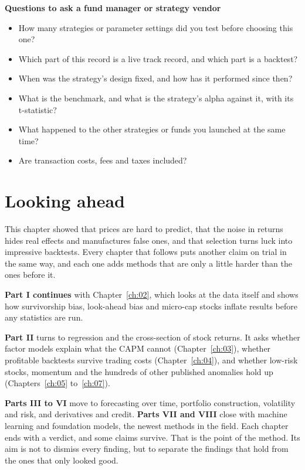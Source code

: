 \textbf{Questions to ask a fund manager or strategy vendor}

\begin{itemize}
  \item How many strategies or parameter settings did you test before choosing this one?
  \item Which part of this record is a live track record, and which part is a backtest?
  \item When was the strategy's design fixed, and how has it performed since then?
  \item What is the benchmark, and what is the strategy's alpha against it, with its t-statistic?
  \item What happened to the other strategies or funds you launched at the same time?
  \item Are transaction costs, fees and taxes included?
\end{itemize}

\section{Looking ahead}
\label{sec:01-ahead}

This chapter showed that prices are hard to predict, that the noise in returns hides real effects and manufactures false ones, and that selection turns luck into impressive backtests. Every chapter that follows puts another claim on trial in the same way, and each one adds methods that are only a little harder than the ones before it.

\textbf{Part I continues} with Chapter~\ref{ch:02}, which looks at the data itself and shows how survivorship bias, look-ahead bias and micro-cap stocks inflate results before any statistics are run.

\textbf{Part II} turns to regression and the cross-section of stock returns. It asks whether factor models explain what the CAPM cannot (Chapter~\ref{ch:03}), whether profitable backtests survive trading costs (Chapter~\ref{ch:04}), and whether low-risk stocks, momentum and the hundreds of other published anomalies hold up (Chapters~\ref{ch:05} to~\ref{ch:07}).

\textbf{Parts III to VI} move to forecasting over time, portfolio construction, volatility and risk, and derivatives and credit. \textbf{Parts VII and VIII} close with machine learning and foundation models, the newest methods in the field. Each chapter ends with a verdict, and some claims survive. That is the point of the method. Its aim is not to dismiss every finding, but to separate the findings that hold from the ones that only looked good.

